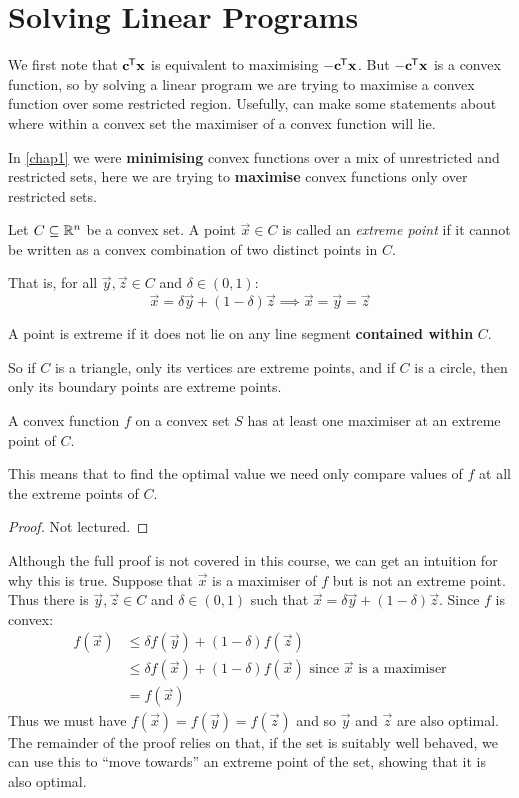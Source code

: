 \documentclass[../main.tex]{subfiles}
\begin{document}
\section{Solving Linear Programs}
We first note that $\mathbf{\bm{c}}^{{\mkern-1.5mu\mathsf{T}}} \mathbf{\bm{x}}$ is equivalent to maximising $-\mathbf{\bm{c}}^{{\mkern-1.5mu\mathsf{T}}} \mathbf{\bm{x}}$.
But $-\mathbf{\bm{c}}^{{\mkern-1.5mu\mathsf{T}}} \mathbf{\bm{x}}$ is a convex function, so by solving a linear program we are trying to maximise a convex function over some restricted region.
Usefully, can make some statements about where within a convex set the maximiser of a convex function will lie.
\begin{remark}[Warning]
  In \cref{chap1} we were \textbf{minimising} convex functions over a mix of unrestricted and restricted sets, here we are trying to \textbf{maximise} convex functions only over restricted sets.
\end{remark}
\begin{definition}
  Let $C \subseteq \mathbb{R}^{n}$ be a convex set.
  A point $\vec{x} \in C$ is called an \textit{extreme point} if it cannot be written as a convex combination of two distinct points in $C$.

  That is, for all $\vec{y}, \vec{z} \in C$ and $\delta \in (0, 1)$:
  \[
    \vec{x} = \delta \vec{y} + (1 - \delta) \vec{z} \implies \vec{x} = \vec{y} = \vec{z}
  \]
\end{definition}
\begin{remark}[Intuition]
  A point is extreme if it does not lie on any line segment \textbf{contained within} $C$.

  So if $C$ is a triangle, only its vertices are extreme points, and if $C$ is a circle, then only its boundary points are extreme points.
\end{remark}
\begin{lemma}
  A convex function $f$ on a convex set $S$ has at least one maximiser at an extreme point of $C$.
\end{lemma}
\begin{remark}
  This means that to find the optimal value we need only compare values of $f$ at all the extreme points of $C$.
\end{remark}
\begin{proof}
  Not lectured.
\end{proof}
Although the full proof is not covered in this course, we can get an intuition for why this is true.
Suppose that $\vec{x}$ is a maximiser of $f$ but is not an extreme point.
Thus there is $\vec{y}, \vec{z} \in C$ and $\delta \in (0, 1)$ such that $\vec{x} = \delta \vec{y} + (1 - \delta)\vec{z}$.
Since $f$ is convex:
\begin{align*}
  f(\vec{x}) &\leq \delta f(\vec{y}) + (1 - \delta)f(\vec{z}) \\
             &\leq \delta f(\vec{x}) + (1 - \delta)f(\vec{x}) \text{ since $\vec{x}$ is a maximiser} \\
             &= f(\vec{x})
\end{align*}
Thus we must have $f(\vec{x}) = f(\vec{y}) = f(\vec{z})$ and so $\vec{y}$ and $\vec{z}$ are also optimal.
The remainder of the proof relies on that, if the set is suitably well behaved, we can use this to ``move towards'' an extreme point of the set, showing that it is also optimal.
\end{document}
